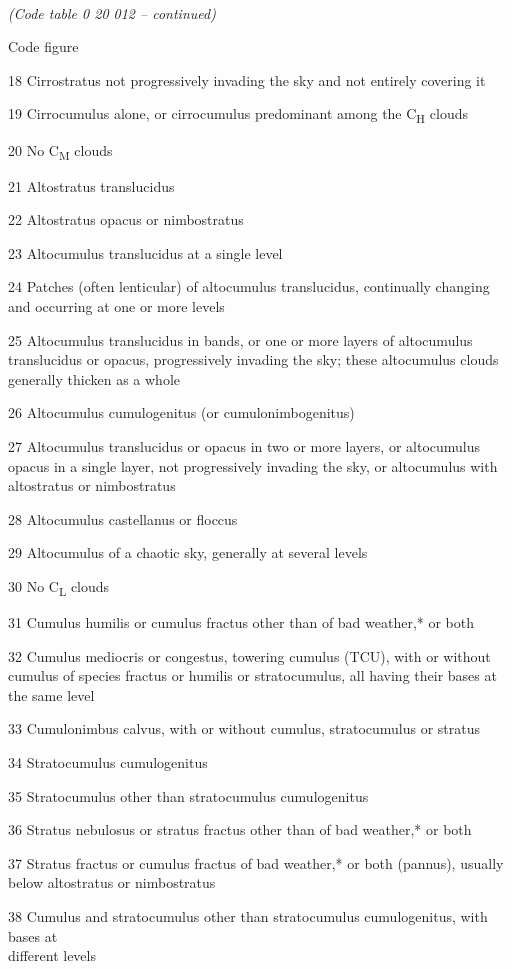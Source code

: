 \emph{\\
(Code table 0 20 012 -- continued)}

Code figure

18 Cirrostratus not progressively invading the sky and not entirely covering it

19 Cirrocumulus alone, or cirrocumulus predominant among the C\textsubscript{H} clouds

20 No C\textsubscript{M} clouds

21 Altostratus translucidus

22 Altostratus opacus or nimbostratus

23 Altocumulus translucidus at a single level

24 Patches (often lenticular) of altocumulus translucidus, continually changing and occurring at one or more levels

25 Altocumulus translucidus in bands, or one or more layers of altocumulus translucidus or opacus, progressively invading the sky; these altocumulus clouds generally thicken as a whole

26 Altocumulus cumulogenitus (or cumulonimbogenitus)

27 Altocumulus translucidus or opacus in two or more layers, or altocumulus opacus in a single layer, not progressively invading the sky, or altocumulus with altostratus or nimbostratus

28 Altocumulus castellanus or floccus

29 Altocumulus of a chaotic sky, generally at several levels

30 No C\textsubscript{L} clouds

31 Cumulus humilis or cumulus fractus other than of bad weather,* or both

32 Cumulus mediocris or congestus, towering cumulus (TCU), with or without cumulus of species fractus or humilis or stratocumulus, all having their bases at the same level

33 Cumulonimbus calvus, with or without cumulus, stratocumulus or stratus

34 Stratocumulus cumulogenitus

35 Stratocumulus other than stratocumulus cumulogenitus

36 Stratus nebulosus or stratus fractus other than of bad weather,* or both

37 Stratus fractus or cumulus fractus of bad weather,* or both (pannus), usually below altostratus or nimbostratus

38 Cumulus and stratocumulus other than stratocumulus cumulogenitus, with bases at\\
different levels

